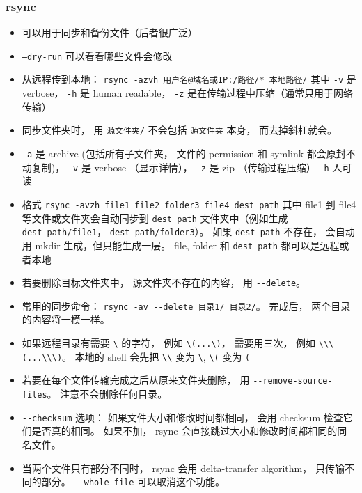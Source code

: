 \subsubsection{rsync}
\begin{itemize}
\item 可以用于同步和备份文件（后者很广泛）
\item \verb|–dry-run| 可以看看哪些文件会修改
\item 从远程传到本地： \verb|rsync -azvh 用户名@域名或IP:/路径/* 本地路径/| 其中 \verb|-v| 是 verbose， \verb|-h| 是 human readable， \verb|-z| 是在传输过程中压缩（通常只用于网络传输）
\item 同步文件夹时， 用 \verb|源文件夹/| 不会包括 \verb|源文件夹| 本身， 而去掉斜杠就会。
\item \verb`-a` 是 archive (包括所有子文件夹， 文件的 permission 和 symlink 都会原封不动复制)， \verb`-v` 是 verbose （显示详情）， \verb`-z` 是 zip （传输过程压缩） \verb`-h` 人可读
\item 格式 \verb`rsync -avzh file1 file2 folder3 file4 dest_path` 其中 file1 到 file4 等文件或文件夹会自动同步到 \verb|dest_path| 文件夹中（例如生成 \verb`dest_path/file1`， \verb`dest_path/folder3`）。 如果 \verb|dest_path| 不存在， 会自动用 mkdir 生成，但只能生成一层。 file, folder 和 \verb|dest_path| 都可以是远程或者本地
\item 若要删除目标文件夹中， 源文件夹不存在的内容， 用 \verb`--delete`。
\item 常用的同步命令： \verb|rsync -av --delete 目录1/ 目录2/|。 完成后， 两个目录的内容将一模一样。
\item 如果远程目录有需要 \verb`\` 的字符， 例如 \verb`\(...\)`， 需要用三次， 例如 \verb`\\\(...\\\)`。 本地的 shell 会先把 \verb`\\` 变为 \verb`\`, \verb`\(` 变为 \verb`(`
\item 若要在每个文件传输完成之后从原来文件夹删除， 用 \verb`--remove-source-files`。 注意不会删除任何目录。
\item \verb|--checksum| 选项： 如果文件大小和修改时间都相同， 会用 checksum 检查它们是否真的相同。 如果不加， rsync 会直接跳过大小和修改时间都相同的同名文件。
\item 当两个文件只有部分不同时， rsync 会用 delta-transfer algorithm， 只传输不同的部分。 \verb|--whole-file| 可以取消这个功能。
\end{itemize}


